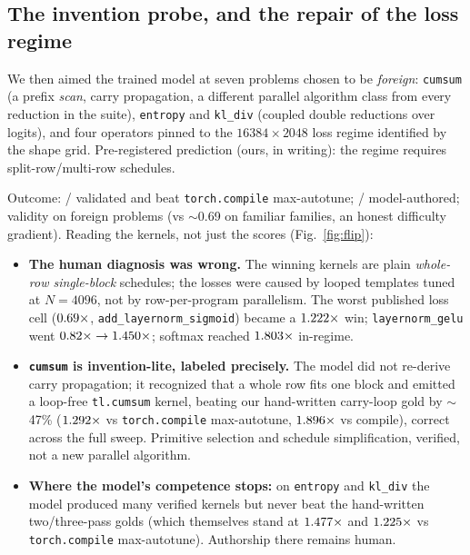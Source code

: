 \documentclass[10pt]{article}
\newcommand{\maxauto}{\texttt{torch.compile} max-autotune}
\begin{document}
\subsection{The invention probe, and the repair of the loss regime}\label{sec:invention}

We then aimed the trained model at seven problems chosen to be \emph{foreign}:
\texttt{cumsum} (a prefix \emph{scan}, carry propagation, a different parallel
algorithm class from every reduction in the suite), \texttt{entropy} and \texttt{kl\_div}
(coupled double reductions over logits), and four operators pinned to the
$16384\times2048$ loss regime identified by the shape grid. Pre-registered prediction
(ours, in writing): the regime requires split-row/multi-row schedules.

Outcome: \invOk/\invOps{} validated and beat \maxauto{}; \invLM/\invOps{} model-authored;
validity on foreign problems \invValidRate{} (vs $\sim$0.69 on familiar families, an
honest difficulty gradient). Reading the kernels, not just the scores
(Fig.~\ref{fig:flip}):

\begin{itemize}
\item \textbf{The human diagnosis was wrong.} The winning kernels are plain
\emph{whole-row single-block} schedules; the losses were caused by looped templates tuned
at $N{=}4096$, not by row-per-program parallelism. The worst published loss cell
($0.69\times$, \texttt{add\_layernorm\_sigmoid}) became a $1.222\times$
win; \texttt{layernorm\_gelu} went $0.82\times \to 1.450\times$;
softmax reached $1.803\times$ in-regime.
\item \textbf{\texttt{cumsum} is invention-lite, labeled precisely.} The model did not
re-derive carry propagation; it recognized that a whole row fits one block and emitted a
loop-free \texttt{tl.cumsum} kernel, beating our hand-written carry-loop gold by
$\sim$47\% ($1.292\times$ vs \maxauto, $1.896\times$ vs compile), correct
across the full sweep. Primitive selection and schedule simplification, verified, not a
new parallel algorithm.
\item \textbf{Where the model's competence stops:} on \texttt{entropy} and \texttt{kl\_div}
the model produced many verified kernels but never beat the hand-written two/three-pass
golds (which themselves stand at $1.477\times$ and $1.225\times$ vs \maxauto).
Authorship there remains human.
\end{itemize}
\end{document}
